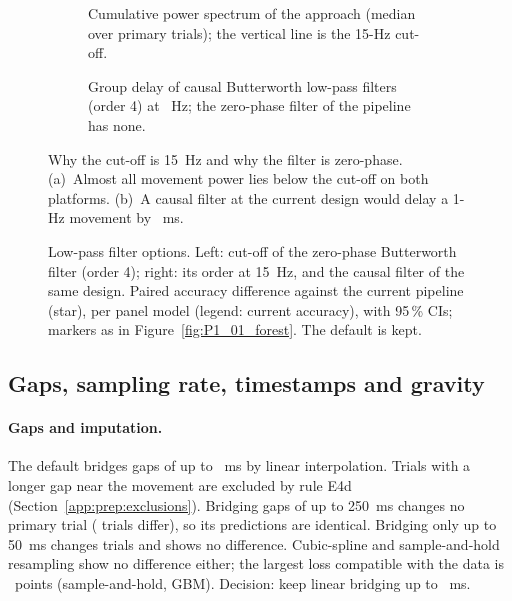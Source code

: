 \begin{figure}[htbp]
\centering
\begin{subfigure}[t]{0.49\linewidth}
\centering
{}
\caption{Cumulative power spectrum of the approach (median over  primary
trials); the vertical line is the 15-Hz cut-off.}
\label{fig:S2_07_spectrum}
\end{subfigure}\hfill
\begin{subfigure}[t]{0.49\linewidth}
\centering
{}
\caption{Group delay of causal Butterworth low-pass filters (order 4) at ~Hz; the zero-phase
filter of the pipeline has none.}
\label{fig:P1_10_filter_delay}
\end{subfigure}
\caption{Why the cut-off is 15~Hz and why the filter is zero-phase. (a)~Almost all movement power lies below
the cut-off on both platforms. (b)~A causal filter at the current design would delay a 1-Hz movement by
~ms.}
\label{fig:app:prep-filter}
\end{figure}

\begin{figure}[htbp]
\centering
{}
\caption{Low-pass filter options. Left: cut-off of the zero-phase Butterworth filter (order 4); right: its
order at 15~Hz, and the causal filter of the same design. Paired accuracy difference against the current
pipeline (star), per panel model (legend: current accuracy), with 95\,\% CIs; markers as in
Figure~\ref{fig:P1_01_forest}. The default is kept.}
\label{fig:P1_02_cutoff}\label{fig:app:prep-cutoff}
\end{figure}

\subsection{Gaps, sampling rate, timestamps and gravity}\label{app:prep:sampling}

\paragraph{Gaps and imputation.} The default bridges gaps of up to ~ms by linear
interpolation. Trials with a longer gap near the movement are excluded by rule E4d
(Section~\ref{app:prep:exclusions}). Bridging gaps of up to 250~ms changes no primary trial
( trials differ), so its predictions are identical. Bridging only up to
50~ms changes  trials and shows no difference. Cubic-spline and
sample-and-hold resampling show no difference either; the largest loss compatible with the data is
~points (sample-and-hold, GBM). Decision: keep linear bridging up to
~ms.

